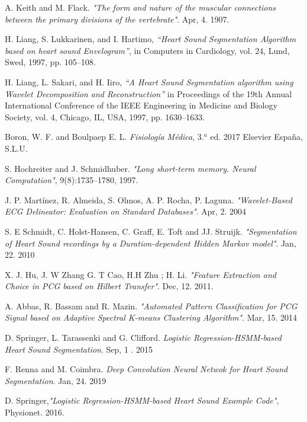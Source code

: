 \begin{thebibliography}{9}
  A. Keith and M. Flack. \textit{"The form and nature of the muscular connections between the primary divisions of the
  vertebrate"}. Apr, 4. 1907.

  H. Liang, S. Lukkarinen, and I. Hartimo, \textit{“Heart Sound Segmentation Algorithm based on heart sound
  Envelogram”}, in Computers in Cardiology, vol. 24, Lund, Swed, 1997, pp. 105–108.

  H. Liang, L. Sakari, and H. Iiro, \textit{“A Heart Sound Segmentation algorithm using Wavelet Decomposition and
  Reconstruction”} in Proceedings of the 19th Annual International Conference of the IEEE Engineering in Medicine and
  Biology Society, vol. 4, Chicago, IL, USA, 1997, pp. 1630–1633.

  Boron, W. F. and Boulpaep E. L. \textit{Fisiología Médica}, 3.$^a$ ed. 2017 Elsevier España, S.L.U.

  S. Hochreiter and J. Schmidhuber. \textit{"Long short-term memory. Neural Computation"}, 9(8):1735–1780, 1997.

  J. P. Martínez, R. Almeida, S. Olmos, A. P. Rocha, P. Laguna. \textit{"Wavelet-Based ECG Delineator: Evaluation on
  Standard Databases"}. Apr, 2. 2004

  S. E Schmidt, C. Holst-Hansen, C. Graff, E. Toft and JJ. Struijk. \textit{"Segmentation of Heart Sound recordings by
  a Duration-dependent Hidden Markov model"}. Jan, 22. 2010

  X. J.  Hu,  J. W Zhang  G. T Cao,  H.H Zhu ;  H. Li. \textit{"Feature Extraction and Choice in PCG based on Hilbert
  Transfer"}. Dec, 12. 2011.

  A. Abbas, R. Bassam and R. Mazin. \textit{"Automated Pattern Classification for PCG Signal based on Adaptive
  Spectral K-means Clustering Algorithm"}. Mar, 15. 2014

  D. Springer, L. Tarassenki and G. Clifford. \textit{Logistic Regression-HSMM-based Heart Sound Segmentation}. Sep, 1
  . 2015

  F. Renna and M. Coimbra. \textit{Deep Convolution Neural Netwok for Heart Sound Segmentation}. Jan, 24. 2019

  D. Springer,\textit{"Logistic Regression-HSMM-based Heart Sound Example Code"}, Physionet. 2016.



\end{thebibliography}
